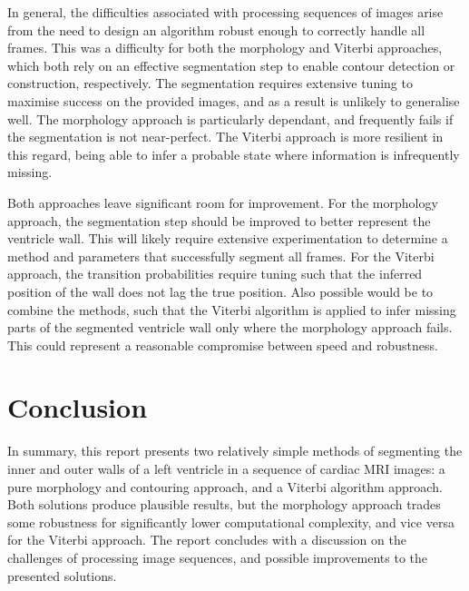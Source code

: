In general, the difficulties associated with processing sequences of images arise from the need to design an algorithm robust enough to correctly handle all frames. This was a difficulty for both the morphology and Viterbi approaches, which both rely on an effective segmentation step to enable contour detection or construction, respectively. The segmentation requires extensive tuning to maximise success on the provided images, and as a result is unlikely to generalise well. The morphology approach is particularly dependant, and frequently fails if the segmentation is not near-perfect. The Viterbi approach is more resilient in this regard, being able to infer a probable state where information is infrequently missing.

Both approaches leave significant room for improvement. For the morphology approach, the segmentation step should be improved to better represent the ventricle wall. This will likely require extensive experimentation to determine a method and parameters that successfully segment all frames. For the Viterbi approach, the transition probabilities require tuning such that the inferred position of the wall does not lag the true position. Also possible would be to combine the methods, such that the Viterbi algorithm is applied to infer missing parts of the segmented ventricle wall only where the morphology approach fails. This could represent a reasonable compromise between speed and robustness.

\section{Conclusion}

In summary, this report presents two relatively simple methods of segmenting the inner and outer walls of a left ventricle in a sequence of cardiac MRI images: a pure morphology and contouring approach, and a Viterbi algorithm approach. Both solutions produce plausible results, but the morphology approach trades some robustness for significantly lower computational complexity, and vice versa for the Viterbi approach. The report concludes with a discussion on the challenges of processing image sequences, and possible improvements to the presented solutions.
